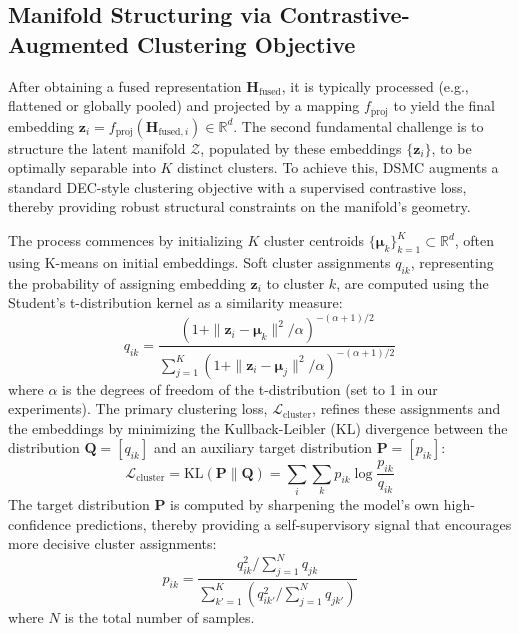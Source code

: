 \documentclass[journal]{IEEEtran}
\begin{document}
\subsection{Manifold Structuring via Contrastive-Augmented Clustering Objective}
After obtaining a fused representation $\mathbf{H}_{\text{fused}}$, it is typically processed (e.g., flattened or globally pooled) and projected by a mapping $f_{\text{proj}}$ to yield the final embedding $\mathbf{z}_i = f_{\text{proj}}(\mathbf{H}_{\text{fused},i}) \in \mathbb{R}^d$. The second fundamental challenge is to structure the latent manifold $\mathcal{Z}$, populated by these embeddings $\{\mathbf{z}_i\}$, to be optimally separable into $K$ distinct clusters. To achieve this, DSMC augments a standard DEC-style clustering objective with a supervised contrastive loss, thereby providing robust structural constraints on the manifold's geometry.

The process commences by initializing $K$ cluster centroids $\{\boldsymbol{\mu}_k\}_{k=1}^K \subset \mathbb{R}^d$, often using K-means on initial embeddings. Soft cluster assignments $q_{ik}$, representing the probability of assigning embedding $\mathbf{z}_i$ to cluster $k$, are computed using the Student's t-distribution kernel as a similarity measure:
\begin{equation}
q_{ik} = \frac{(1 + \|\mathbf{z}_i - \boldsymbol{\mu}_k\|^2 / \alpha)^{-(\alpha+1)/2}}{\sum_{j=1}^K (1 + \|\mathbf{z}_i - \boldsymbol{\mu}_j\|^2 / \alpha)^{-(\alpha+1)/2}}
\label{eq:soft_assignment_revised}
\end{equation}
where $\alpha$ is the degrees of freedom of the t-distribution (set to 1 in our experiments).
The primary clustering loss, $\mathcal{L}_{\text{cluster}}$, refines these assignments and the embeddings by minimizing the Kullback-Leibler (KL) divergence between the distribution $\mathbf{Q} = [q_{ik}]$ and an auxiliary target distribution $\mathbf{P} = [p_{ik}]$:
\begin{equation}
\mathcal{L}_{\text{cluster}} = \text{KL}(\mathbf{P} \| \mathbf{Q}) = \sum_i \sum_k p_{ik} \log \frac{p_{ik}}{q_{ik}}
\label{eq:kl_loss_revised}
\end{equation}
The target distribution $\mathbf{P}$ is computed by sharpening the model's own high-confidence predictions, thereby providing a self-supervisory signal that encourages more decisive cluster assignments:
\begin{equation}
p_{ik} = \frac{q_{ik}^2 / \sum_{j=1}^N q_{jk}}{\sum_{k'=1}^K (q_{ik'}^2 / \sum_{j=1}^N q_{jk'})}
\label{eq:target_dist_revised}
\end{equation}
where $N$ is the total number of samples.
\end{document}
